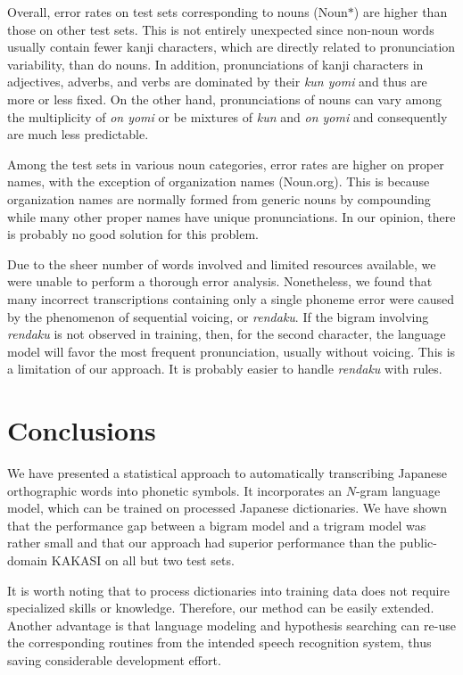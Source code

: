Overall, error rates on test sets corresponding to nouns
(Noun$\ast$) are higher than those on other test sets. This is not
entirely unexpected since non-noun words usually contain fewer
kanji characters, which are directly related to pronunciation
variability, than do nouns. In addition, pronunciations of kanji
characters in adjectives, adverbs, and verbs are dominated by
their {\it kun yomi} and thus are more or less fixed. On the other
hand, pronunciations of nouns can vary among the multiplicity of
{\it on yomi} or be mixtures of {\it kun} and {\it on yomi} and
consequently are much less predictable.

Among the test sets in various noun categories, error rates are
higher on proper names, with the exception of organization names
(Noun.org). This is because organization names are normally formed
from generic nouns by compounding while many other proper names
have unique pronunciations. In our opinion, there is probably no
good solution for this problem.

Due to the sheer number of words involved and limited resources
available, we were unable to perform a thorough error analysis.
Nonetheless, we found that many incorrect transcriptions
containing only a single phoneme error were caused by the
phenomenon of sequential voicing, or {\it rendaku}. If the bigram
involving {\it rendaku} is not observed in training, then, for the
second character, the language model will favor the most frequent
pronunciation, usually without voicing. This is a limitation of
our approach. It is probably easier to handle {\it rendaku} with
rules.


\section{Conclusions}
\label{conclu}
We have presented a statistical approach to automatically
transcribing Japanese orthographic words into phonetic symbols. It
incorporates an $N$-gram language model, which can be trained on
processed Japanese dictionaries. We have shown that the
performance gap between a bigram model and a trigram model was
rather small and that our approach had superior performance than
the public-domain KAKASI on all but two test sets.

It is worth noting that to process dictionaries into training data
does not require specialized skills or knowledge. Therefore, our
method can be easily extended. Another advantage is that language
modeling and hypothesis searching can re-use the corresponding
routines from the intended speech recognition system, thus saving
considerable development effort.




